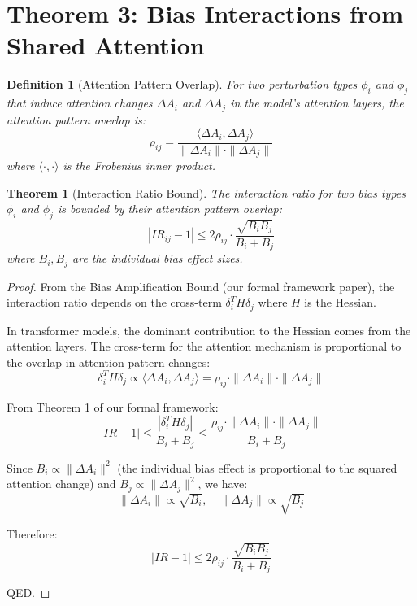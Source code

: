 \documentclass[11pt]{article}
\newtheorem{theorem}{Theorem}
\newtheorem{definition}{Definition}
\begin{document}
\section{Theorem 3: Bias Interactions from Shared Attention}

\begin{definition}[Attention Pattern Overlap]
For two perturbation types $\phi_i$ and $\phi_j$ that induce attention changes $\Delta A_i$ and $\Delta A_j$ in the model's attention layers, the attention pattern overlap is:
\begin{equation}
\rho_{ij} = \frac{\langle \Delta A_i, \Delta A_j \rangle}{\|\Delta A_i\| \cdot \|\Delta A_j\|}
\end{equation}
where $\langle\cdot,\cdot\rangle$ is the Frobenius inner product.
\end{definition}

\begin{theorem}[Interaction Ratio Bound]
The interaction ratio for two bias types $\phi_i$ and $\phi_j$ is bounded by their attention pattern overlap:
\begin{equation}
|IR_{ij} - 1| \leq 2\rho_{ij} \cdot \frac{\sqrt{B_i B_j}}{B_i + B_j}
\end{equation}
where $B_i, B_j$ are the individual bias effect sizes.
\end{theorem}

\begin{proof}
From the Bias Amplification Bound (our formal framework paper), the interaction ratio depends on the cross-term $\delta_i^T H \delta_j$ where $H$ is the Hessian.

In transformer models, the dominant contribution to the Hessian comes from the attention layers. The cross-term for the attention mechanism is proportional to the overlap in attention pattern changes:
\begin{equation}
\delta_i^T H \delta_j \propto \langle \Delta A_i, \Delta A_j \rangle = \rho_{ij} \cdot \|\Delta A_i\| \cdot \|\Delta A_j\|
\end{equation}

From Theorem 1 of our formal framework:
\begin{equation}
|IR - 1| \leq \frac{|\delta_i^T H \delta_j|}{B_i + B_j} \leq \frac{\rho_{ij} \cdot \|\Delta A_i\| \cdot \|\Delta A_j\|}{B_i + B_j}
\end{equation}

Since $B_i \propto \|\Delta A_i\|^2$ (the individual bias effect is proportional to the squared attention change) and $B_j \propto \|\Delta A_j\|^2$, we have:
\begin{equation}
\|\Delta A_i\| \propto \sqrt{B_i}, \quad \|\Delta A_j\| \propto \sqrt{B_j}
\end{equation}

Therefore:
\begin{equation}
|IR - 1| \leq 2\rho_{ij} \cdot \frac{\sqrt{B_i B_j}}{B_i + B_j}
\end{equation}

QED.
\end{proof}
\end{document}
